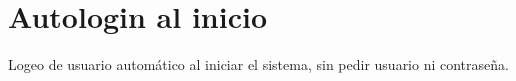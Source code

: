 
\chapter{Autologin al inicio} %

\label{app:autologin} %

Logeo de usuario automático al iniciar el sistema, sin pedir usuario ni contraseña.

\newpage


